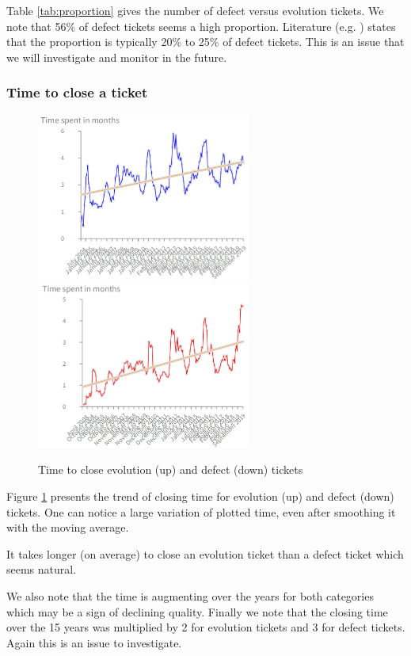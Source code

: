 \documentclass[10pt,conference]{IEEEtran}
\begin{document}
Table \ref{tab:proportion} gives the number of defect versus evolution tickets.
We note that 56\% of defect tickets seems a high proportion.
Literature (e.g. \cite{Pigo97a} ) states that the proportion is typically 20\% to 25\% of defect tickets.
This is an issue that we will investigate and monitor in the future.

\subsubsection{Time to close a ticket}

\begin{figure}[htbp]
  \centering
  \includegraphics[width=70mm]{./images/openCloseEvol.png} \\
  \includegraphics[width=70mm]{./images/openCloseBug.png}
  \caption{Time to close evolution (up) and defect (down) tickets}
  \label{fig:closingTime}
\end{figure}

Figure \ref{fig:closingTime} presents the trend of closing time for evolution (up) and defect (down) tickets.
One can notice a large variation of plotted time, even after smoothing it with the moving average.


It takes longer (on average) to close an evolution ticket than a defect ticket which seems natural.

We also note that the time is augmenting over the years for both categories which may be a sign of declining quality.
Finally we note that the closing time over the 15 years was multiplied by 2 for evolution tickets and 3 for defect tickets.
Again this is an issue to investigate.
\end{document}
